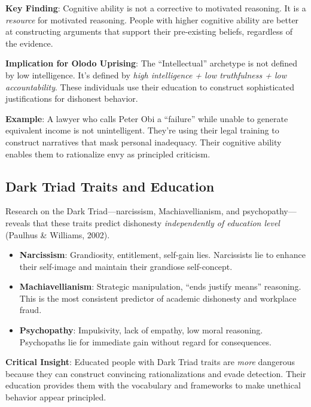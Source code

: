 \documentclass[11pt,a4paper]{article}
\begin{document}
\textbf{Key Finding}: Cognitive ability is not a corrective to motivated reasoning. It is a \textit{resource} for motivated reasoning. People with higher cognitive ability are better at constructing arguments that support their pre-existing beliefs, regardless of the evidence.

\textbf{Implication for Olodo Uprising}: The ``Intellectual'' archetype is not defined by low intelligence. It's defined by \textit{high intelligence + low truthfulness + low accountability}. These individuals use their education to construct sophisticated justifications for dishonest behavior.

\textbf{Example}: A lawyer who calls Peter Obi a ``failure'' while unable to generate equivalent income is not unintelligent. They're using their legal training to construct narratives that mask personal inadequacy. Their cognitive ability enables them to rationalize envy as principled criticism.

\subsection{Dark Triad Traits and Education}

Research on the Dark Triad—narcissism, Machiavellianism, and psychopathy—reveals that these traits predict dishonesty \textit{independently of education level} (Paulhus \& Williams, 2002).

\begin{itemize}[leftmargin=*]
    \item \textbf{Narcissism}: Grandiosity, entitlement, self-gain lies. Narcissists lie to enhance their self-image and maintain their grandiose self-concept.
    
    \item \textbf{Machiavellianism}: Strategic manipulation, ``ends justify means'' reasoning. This is the most consistent predictor of academic dishonesty and workplace fraud.
    
    \item \textbf{Psychopathy}: Impulsivity, lack of empathy, low moral reasoning. Psychopaths lie for immediate gain without regard for consequences.
\end{itemize}

\textbf{Critical Insight}: Educated people with Dark Triad traits are \textit{more} dangerous because they can construct convincing rationalizations and evade detection. Their education provides them with the vocabulary and frameworks to make unethical behavior appear principled.
\end{document}
